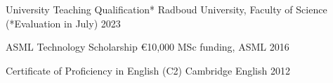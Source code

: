

\begin{cvhonors}

  \cvhonor
    {University Teaching Qualification*} %
    {Radboud University, Faculty of Science (*Evaluation in July)} %
    {} %
    {2023} %

  \cvhonor
    {ASML Technology Scholarship} %
    {€10,000 MSc funding, ASML} %
    {} %
    {2016} %

  \cvhonor
    {Certificate of Proficiency in English (C2)} %
    {Cambridge English} %
    {} %
    {2012} %


\end{cvhonors}
